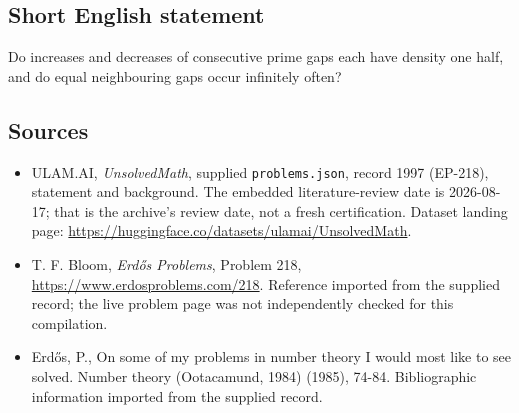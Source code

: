\documentclass[11pt,a4paper]{article}
\begin{document}
\subsection{Short English statement}

Do increases and decreases of consecutive prime gaps each have density one half, and do equal neighbouring gaps occur infinitely often?

\subsection{Sources}

{\small

\begin{itemize}

\item[\hypertarget{source:1997:1}{S1}] ULAM.AI, \emph{UnsolvedMath}, supplied \texttt{problems.json}, record 1997 (EP-218), statement and background. The embedded literature-review date is 2026-08-17; that is the archive’s review date, not a fresh certification. Dataset landing page: \url{https://huggingface.co/datasets/ulamai/UnsolvedMath}.

\item[\hypertarget{source:1997:2}{S2}] T. F. Bloom, \emph{Erdős Problems}, Problem 218, \url{https://www.erdosproblems.com/218}. Reference imported from the supplied record; the live problem page was not independently checked for this compilation.

\item[\hypertarget{source:1997:3}{S3}] Erd\H{o}s, P., On some of my problems in number theory I would most like to see solved. Number theory (Ootacamund, 1984) (1985), 74-84. Bibliographic information imported from the supplied record.

\end{itemize}

}

\label{end:1997}
\end{document}
